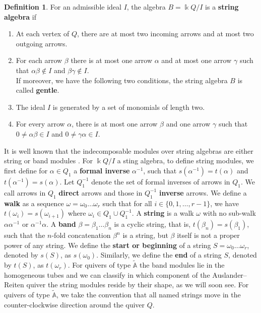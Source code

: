\documentclass[12pt]{amsart}
\theoremstyle{plain}
\theoremstyle{definition}
\newtheorem{defn}{Definition}[section]
\theoremstyle{remark}
\begin{document}
\begin{defn}
For an admissible ideal $I$, the algebra $B = \Bbbk Q/ I$ is a \textbf{string algebra} if
\begin{enumerate}
\item At each vertex of $Q$, there are at most two incoming arrows and at most two outgoing arrows.
\item For each arrow $\beta$ there is at most one arrow $\alpha$ and at most one arrow $\gamma$ such that $\alpha\beta \notin I$ and $\beta\gamma \notin I$.  \\

If moreover, we have the following two conditions, the string algebra $B$ is called \textbf{gentle}.\\

\item The ideal $I$ is generated by a set of monomials of length two.
\item For every arrow $\alpha$, there is at most one arrow $\beta$ and one arrow $\gamma$ such that $0 \neq \alpha\beta \in I$ and {\color{black} $0 \neq \gamma\alpha \in I$}.
\end{enumerate}
\end{defn}

It is well known that the indecomposable modules over string algebras are either string or band modules \cite{BR}. For $\Bbbk Q/I$ a sting algebra, to define string modules, we first define for $\alpha\in Q_1$ a \textbf{formal inverse} $\alpha^{-1}$, such that $s(\alpha^{-1}) = t(\alpha)$ and $t(\alpha^{-1}) = s(\alpha)$. Let $Q_1^{-1}$ denote the set of formal inverses of arrows in $Q_1$. We call arrows in $Q_1$ \textbf{direct} arrows and those in $Q_1^{-1}$ \textbf{inverse} arrows. We define a \textbf{walk} as a sequence $\omega = \omega_0\dots \omega_r$ such that for all $i\in\{0,1,\dots,r-1\}$, we have $t(\omega_i) = s(\omega_{i+1})$ where $\omega_i \in Q_1 \cup Q_1^{-1}$. A \textbf{string} is a walk $\omega$ with no sub-walk $\alpha\alpha^{-1}$ or $\alpha^{-1}\alpha$. A \textbf{band} $\beta = \beta_1\dots \beta_n$ is a cyclic string, that is, $t(\beta_n) = s(\beta_1)$, such that the $n$-fold concatenation $\beta^n$ is a string, but $\beta$ itself is not a proper power of any string. We define the \textbf{start or beginning} of a string $S = \omega_0\dots \omega_r$, denoted by $s(S)$, as $s(\omega_0)$. Similarly, we define the \textbf{end} of a string $S$, denoted by $t(S)$, as $t(\omega_r)$. For quivers of type $\mathbb{\tilde{A}}$ the band modules lie in the homogeneous tubes and we can classify in which component of the Auslander--Reiten quiver the string modules reside by their shape, as we will soon see. For quivers of type $\tilde{\mathbb{A}}$, we take the convention that all named strings move in the counter-clockwise direction around the quiver $Q$. 
\end{document}
